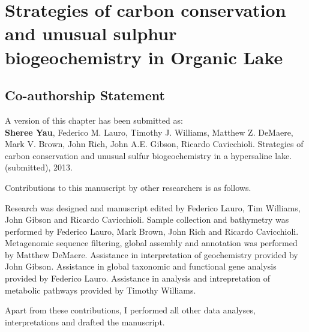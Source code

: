 \chapter{Strategies of carbon conservation and unusual sulphur biogeochemistry in Organic Lake}
\label{ch:org}
\acresetall

\section*{Co-authorship Statement}
A version of this chapter has been submitted as:\\

\textbf{Sheree Yau}, Federico M. Lauro, Timothy J. Williams, Matthew Z. DeMaere, Mark V. Brown, John Rich, 
John A.E. Gibson, Ricardo Cavicchioli. 
Strategies of carbon conservation and unusual sulfur biogeochemistry in a hypersaline lake.
(submitted), 2013.

Contributions to this manuscript by other researchers is as follows.

Research was designed and manuscript edited by Federico Lauro, Tim Williams, John Gibson and Ricardo Cavicchioli.
Sample collection and bathymetry was performed by Federico Lauro, Mark Brown, John Rich and Ricardo Cavicchioli.
Metagenomic sequence filtering, global assembly and annotation was performed by Matthew DeMaere.
Assistance in interpretation of geochemistry provided by John Gibson. 
Assistance in global taxonomic and functional gene analysis provided by Federico Lauro. 
Assistance in analysis and intrepretation of metabolic pathways provided by Timothy Williams.

Apart from these contributions, I performed all other data analyses, interpretations and drafted the manuscript.
\newpage


